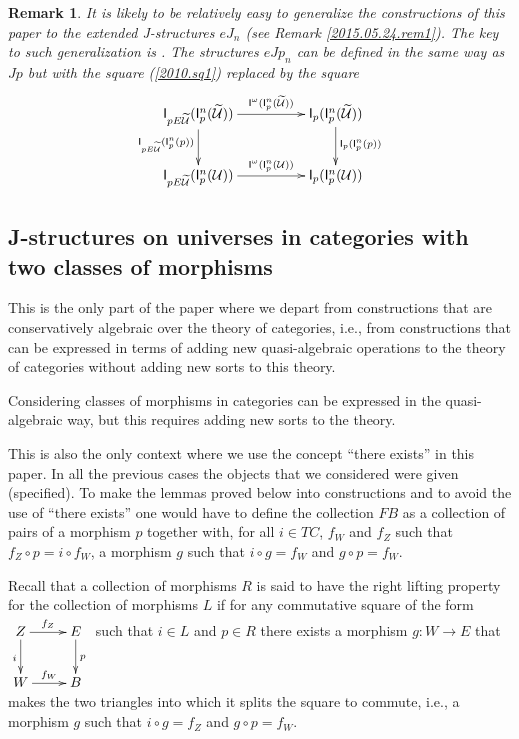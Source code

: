 \documentclass[12pt]{article}
\numberwithin{equation}{section}
\newenvironment{eq}{\begin{equation}}{\end{equation}}
\newtheorem{remark}[proposition]{Remark}
\newcommand{\llabel}[1]{\label{#1}}
\newcommand{\sr}{\rightarrow}
\newcommand{\wt}{\widetilde}
\newcommand{\U}{\mathcal{U}}
\newcommand{\I}{\mathsf{I}}
\begin{document}
%
\begin{remark}\rm
\llabel{2015.05.24.rem2} It is likely to be relatively easy to generalize the
constructions of this paper to the extended J-structures $eJ_n$ (see Remark
\ref{2015.05.24.rem1}). The key to such generalization is \cite[Remark
  3.13]{fromunivwithPi}. The structures $eJp_n$ can be defined in the same way
as $Jp$ but with the square (\ref{2010.sq1}) replaced by the square
%
\begin{eq}
\llabel{2015.05.24.sq1}
\begin{xy}
          \xymatrix@C=4pc{ \I_{pE\wt{\U}}(\I_p^n(\wt{\U}))
            \ar[r]^-{\I^{\omega}(\I_p^n(\wt{\U}))} \ar[d]_{\I_{pE\wt{\U}}(\I_p^n(p))}
            & \I_p(\I_p^n(\wt{\U}))
            \ar[d]^{\I_p(\I_p^n(p))}\\ \I_{pE\wt{\U}}(\I_p^n(\U))
            \ar[r]^-{\I^{\omega}(\I_p^n(\U))} & \I_p(\I_p^n(\U)) }
\end{xy}
\end{eq}%
\end{remark}
%



\subsection{J-structures on universes in categories with two classes of morphisms}
%
%
This is the only part of the paper where we depart from constructions that are
conservatively algebraic over the theory of categories, i.e., from
constructions that can be expressed in terms of adding new quasi-algebraic
operations to the theory of categories without adding new sorts to this theory.

Considering classes of morphisms in categories can be expressed in the
quasi-algebraic way, but this requires adding new sorts to the theory.

This is also the only context where we use the concept ``there exists'' in this
paper. In all the previous cases the objects that we considered were given
(specified). To make the lemmas proved below into constructions and to avoid
the use of ``there exists'' one would have to define the collection $FB$ as a
collection of pairs of a morphism $p$ together with, for all $i\in TC$, $f_W$
and $f_Z$ such that $f_Z\circ p=i\circ f_W$, a morphism $g$ such that $i\circ
g=f_W$ and $g\circ p=f_W$.

Recall that a collection of morphisms $R$ is said to have the right lifting
property for the collection of morphisms $L$ if for any commutative square of
the form
%
$
\begin{xy}
          \xymatrix@C=2pc{ Z \ar[r]^-{f_Z} \ar[d]_{i} & E \ar[d]^{p}\\ W
            \ar[r]^-{f_W} & B }
\end{xy}
$
%
such that $i\in L$ and $p\in R$ there exists a morphism $g:W\sr E$ that makes
the two triangles into which it splits the square to commute, i.e., a morphism
$g$ such that $i\circ g=f_Z$ and $g\circ p=f_W$.
%
\end{document}
